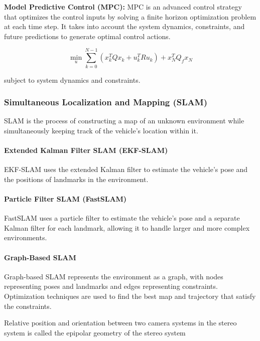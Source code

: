 \documentclass[12pt]{article}
\begin{document}
\textbf{Model Predictive Control (MPC):} MPC is an advanced control strategy that optimizes the control inputs by solving a finite horizon optimization problem at each time step. It takes into account the system dynamics, constraints, and future predictions to generate optimal control actions.

\[
\min_{u} \sum_{k=0}^{N-1} \left( x_k^T Q x_k + u_k^T R u_k \right) + x_N^T Q_f x_N
\]

subject to system dynamics and constraints.

\subsubsection{Simultaneous Localization and Mapping (SLAM)}

SLAM is the process of constructing a map of an unknown environment while simultaneously keeping track of the vehicle's location within it.

\paragraph{Extended Kalman Filter SLAM (EKF-SLAM)}

EKF-SLAM uses the extended Kalman filter to estimate the vehicle's pose and the positions of landmarks in the environment.

\paragraph{Particle Filter SLAM (FastSLAM)}

FastSLAM uses a particle filter to estimate the vehicle's pose and a separate Kalman filter for each landmark, allowing it to handle larger and more complex environments.

\paragraph{Graph-Based SLAM}

Graph-based SLAM represents the environment as a graph, with nodes representing poses and landmarks and edges representing constraints. Optimization techniques are used to find the best map and trajectory that satisfy the constraints.

Relative position and orientation between two camera systems in the stereo system is called the epipolar geometry of the stereo system
\end{document}
